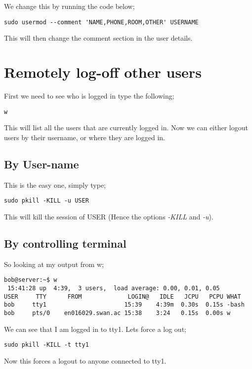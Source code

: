 We change this by running the code below;

\begin{lstlisting}
sudo usermod --comment 'NAME,PHONE,ROOM,OTHER' USERNAME
\end{lstlisting}

This will then change the comment section in the user details.

\section{Remotely log-off other users}

First we need to see who is logged in type the following;

\begin{lstlisting}
w
\end{lstlisting}

This will list all the users that are currently logged in. Now we can either logout users by their username, or where they are logged in.

\subsection{By User-name}

This is the easy one, simply type;

\begin{lstlisting}
sudo pkill -KILL -u USER
\end{lstlisting}

This will kill the session of USER (Hence the options \textit{-KILL} and \textit{-u}).

\subsection{By controlling terminal}

So looking at my output from w;

\begin{verbatim}
bob@server:~$ w
 15:41:28 up  4:39,  3 users,  load average: 0.00, 0.01, 0.05
USER     TTY      FROM             LOGIN@   IDLE   JCPU   PCPU WHAT
bob     tty1                      15:39    4:39m  0.30s  0.15s -bash
bob     pts/0    en016029.swan.ac 15:38    3:24   0.15s  0.00s w
\end{verbatim}

We can see that I am logged in to tty1. Lets force a log out;

\begin{lstlisting}
sudo pkill -KILL -t tty1
\end{lstlisting}

Now this forces a logout to anyone connected to tty1.
